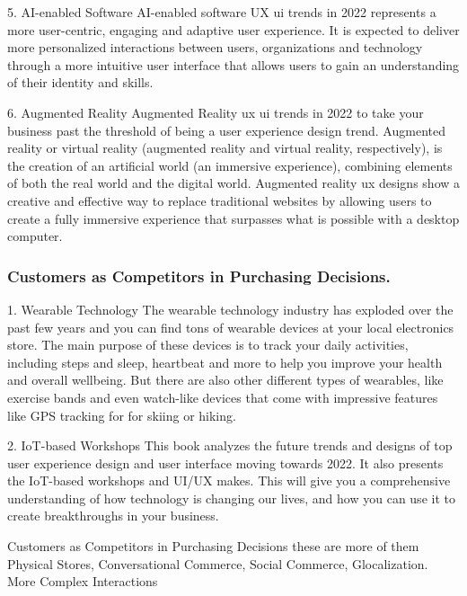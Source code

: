 \documentclass{article}
\begin{document}
5. AI-enabled Software
 AI-enabled software UX ui trends in 2022 represents a more user-centric, engaging and adaptive user experience. It is expected to deliver more personalized interactions between users, organizations and technology through a more intuitive user interface that allows users to gain an understanding of their identity and skills.
 
 6. Augmented Reality
 Augmented Reality ux ui trends in 2022 to take your business past the threshold of being a user experience design trend. Augmented reality or virtual reality (augmented reality and virtual reality, respectively), is the creation of an artificial world (an immersive experience), combining elements of both the real world and the digital world. Augmented reality ux designs show a creative and effective way to replace traditional websites by allowing users to create a fully immersive experience that surpasses what is possible with a desktop computer.
 
\subsubsection{Customers as Competitors in Purchasing Decisions.} 
1. Wearable Technology
The wearable technology industry has exploded over the past few years and you can find tons of wearable devices at your local electronics store. The main purpose of these devices is to track your daily activities, including steps and sleep, heartbeat and more to help you improve your health and overall wellbeing. But there are also other different types of wearables, like exercise bands and even watch-like devices that come with impressive features like GPS tracking for for skiing or hiking.

 2. IoT-based Workshops
 This book analyzes the future trends and designs of top user experience design and user interface moving towards 2022. It also presents the IoT-based workshops and UI/UX makes. This will give you a comprehensive understanding of how technology is changing our lives, and how you can use it to create breakthroughs in your business.
 
 Customers as Competitors in Purchasing Decisions these are more of them Physical Stores, Conversational Commerce, Social Commerce, Glocalization. More Complex Interactions
 
\end{document}
